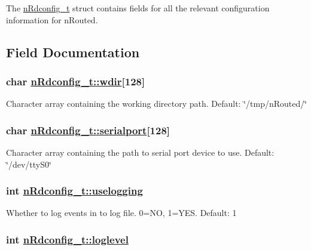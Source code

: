 The \hyperlink{structnRdconfig__t}{n\-Rdconfig\_\-t} struct contains fields for all the relevant configuration information for n\-Routed. 



\subsection{Field Documentation}
\hypertarget{structnRdconfig__t_a7672061ebda79d00c44848f9fdd92f1}{
\subsubsection[wdir]{\setlength{\rightskip}{0pt plus 5cm}char \hyperlink{structnRdconfig__t_a7672061ebda79d00c44848f9fdd92f1}{n\-Rdconfig\_\-t::wdir}\mbox{[}128\mbox{]}}}
\label{structnRdconfig__t_a7672061ebda79d00c44848f9fdd92f1}


Character array containing the working directory path. Default: \char`\"{}/tmp/n\-Routed/\char`\"{} \hypertarget{structnRdconfig__t_3547a24e8d3de9b4fd944436dc8ac4ce}{
\subsubsection[serialport]{\setlength{\rightskip}{0pt plus 5cm}char \hyperlink{structnRdconfig__t_3547a24e8d3de9b4fd944436dc8ac4ce}{n\-Rdconfig\_\-t::serialport}\mbox{[}128\mbox{]}}}
\label{structnRdconfig__t_3547a24e8d3de9b4fd944436dc8ac4ce}


Character array containing the path to serial port device to use. Default: \char`\"{}/dev/tty\-S0\char`\"{} \hypertarget{structnRdconfig__t_1ea3e47a7eb26c77e75e086d43accfb5}{
\subsubsection[uselogging]{\setlength{\rightskip}{0pt plus 5cm}int \hyperlink{structnRdconfig__t_1ea3e47a7eb26c77e75e086d43accfb5}{n\-Rdconfig\_\-t::uselogging}}}
\label{structnRdconfig__t_1ea3e47a7eb26c77e75e086d43accfb5}


Whether to log events in to log file. 0=NO, 1=YES. Default: 1 \hypertarget{structnRdconfig__t_22ac64dd30576544d6da3aaad596093f}{
\subsubsection[loglevel]{\setlength{\rightskip}{0pt plus 5cm}int \hyperlink{structnRdconfig__t_22ac64dd30576544d6da3aaad596093f}{n\-Rdconfig\_\-t::loglevel}}}
\label{structnRdconfig__t_22ac64dd30576544d6da3aaad596093f}


